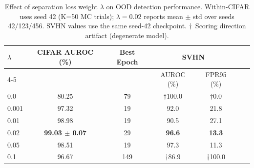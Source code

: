 \begin{table}[htbp]
    \centering
    \caption{Effect of separation loss weight $\lambda$ on OOD detection performance.
             Within-CIFAR uses seed 42 (K=50 MC trials); $\lambda=0.02$ reports
             mean $\pm$ std over seeds 42/123/456.
             SVHN values use the same seed-42 checkpoint.
             $\dagger$~Scoring direction artifact (degenerate model).}
    \label{tab:separation-loss}
    \begin{tabular}{lcccccc}
        \toprule
        $\lambda$ & CIFAR AUROC (\%) & Best Epoch & \multicolumn{2}{c}{SVHN} \\
        \cmidrule(lr){4-5}
                  &                  &            & AUROC (\%) & FPR95 (\%) \\
        \midrule
        0.0   & 80.25              & 79  & $\dagger$100.0 & $\dagger$0.0 \\
        0.001 & 97.32              & 19  & 92.0           & 21.8 \\
        0.01  & 98.98              & 19  & 90.5           & 27.1 \\
        0.02  & \textbf{99.03 $\pm$ 0.07} & 29 & \textbf{96.6} & \textbf{13.3} \\
        0.05  & 98.51              & 19  & 97.3           & 11.3 \\
        0.1   & 96.67              & 149 & $\dagger$86.9  & $\dagger$100.0 \\
        \bottomrule
    \end{tabular}
\end{table}
